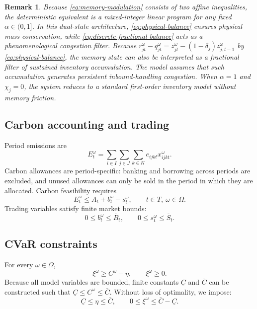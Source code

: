 \documentclass[11pt,a4paper]{article}
\newtheorem{remark}{Remark}
\begin{document}
\begin{remark}
Because \cref{eq:memory-modulation} consists of two affine inequalities,
the deterministic equivalent is a mixed-integer linear program for any
fixed \(\alpha\in(0,1]\). In this dual-state architecture,
\cref{eq:physical-balance} ensures physical mass conservation, while
\cref{eq:discrete-fractional-balance} acts as a phenomenological
congestion filter. Because
\(r_{jt}^{\omega}-q_{jt}^{\omega}=z_{jt}^{\omega}-(1-\delta_j)z_{j,t-1}^{\omega}\)
by \cref{eq:physical-balance}, the memory state can also be interpreted
as a fractional filter of sustained inventory accumulation. The model
assumes that such accumulation generates persistent inbound-handling
congestion. When \(\alpha=1\) and \(\chi_j=0\), the system reduces
to a standard first-order inventory model without memory friction.
\end{remark}

\subsection{Carbon accounting and trading}

Period emissions are
\begin{equation}
  E_t^\omega
  =
  \sum_{i\in I}
  \sum_{j\in J}
  \sum_{k\in K}
  e_{ijkt}x_{ijkt}^{\omega}.
  \label{eq:emissions}
\end{equation}
Carbon allowances are period-specific: banking and borrowing across
periods are excluded, and unused allowances can only be sold in the
period in which they are allocated. Carbon feasibility requires
\begin{equation}
  E_t^\omega
  \leq
  A_t+b_t^\omega-s_t^\omega,
  \qquad
  t\in T,\ \omega\in\Omega.
  \label{eq:carbon-balance}
\end{equation}
Trading variables satisfy finite market bounds:
\begin{equation}
  0\leq b_t^\omega\leq\overline{B}_t,
  \qquad
  0\leq s_t^\omega\leq\overline{S}_t.
  \label{eq:trading-bounds}
\end{equation}

\subsection{CVaR constraints}

For every \(\omega\in\Omega\),
\begin{equation}
  \xi^\omega\geq C^\omega-\eta,
  \qquad
  \xi^\omega\geq0.
  \label{eq:cvar-constraints}
\end{equation}
Because all model variables are bounded, finite constants
\(\underline{C}\) and \(\overline{C}\) can be constructed such that
\(\underline{C}\leq C^\omega\leq\overline{C}\). Without loss of
optimality, we impose:
\begin{equation}
  \underline{C}\leq\eta\leq\overline{C},
  \qquad
  0\leq\xi^\omega\leq\overline{C}-\underline{C}.
  \label{eq:cvar-bounds}
\end{equation}
\end{document}
